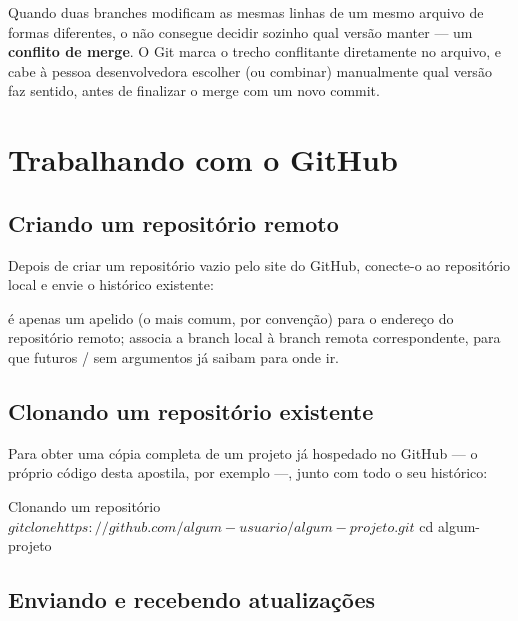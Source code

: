 Quando duas branches modificam as mesmas linhas de um mesmo arquivo de formas diferentes, o  não consegue decidir sozinho qual versão manter — um \textbf{conflito de merge}. O Git marca o trecho conflitante diretamente no arquivo, e cabe à pessoa desenvolvedora escolher (ou combinar) manualmente qual versão faz sentido, antes de finalizar o merge com um novo commit.

\section{Trabalhando com o GitHub}

\subsection{Criando um repositório remoto}

Depois de criar um repositório vazio pelo site do GitHub, conecte-o ao repositório local e envie o histórico existente:


 é apenas um apelido (o mais comum, por convenção) para o endereço do repositório remoto;  associa a branch local  à branch remota correspondente, para que futuros / sem argumentos já saibam para onde ir.

\subsection{Clonando um repositório existente}

Para obter uma cópia completa de um projeto já hospedado no GitHub — o próprio código desta apostila, por exemplo —, junto com todo o seu histórico:

\begin{codigobash}{Clonando um repositório}
$ git clone https://github.com/algum-usuario/algum-projeto.git
$ cd algum-projeto
\end{codigobash}

\subsection{Enviando e recebendo atualizações}

